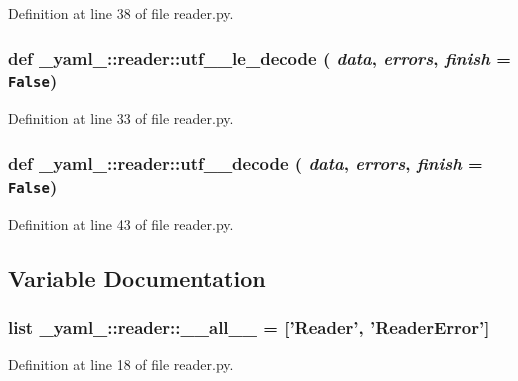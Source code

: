 Definition at line 38 of file reader.py.
\subsubsection{\setlength{\rightskip}{0pt plus 5cm}def \_\-yaml\_\-::reader::utf\_\_\-le\_\-decode ( {\em data},  {\em errors},  {\em finish} = {\tt False})}\label{namespace__yaml___1_1reader_e7a2e6f258df3593c4cc9da685cfa72d}




Definition at line 33 of file reader.py.
\subsubsection{\setlength{\rightskip}{0pt plus 5cm}def \_\-yaml\_\-::reader::utf\_\_\-decode ( {\em data},  {\em errors},  {\em finish} = {\tt False})}\label{namespace__yaml___1_1reader_5fd7d1664804a39904d97992b9e24255}




Definition at line 43 of file reader.py.

\subsection{Variable Documentation}
\subsubsection{\setlength{\rightskip}{0pt plus 5cm}list {\bf \_\-yaml\_\-::reader::\_\-\_\-all\_\-\_\-} = ['{\bf Reader}', '{\bf ReaderError}']\hspace{0.3cm}{\tt  [static]}}\label{namespace__yaml___1_1reader_e87ba0f5483ec60fd86a0ecaf43d76b8}




Definition at line 18 of file reader.py.